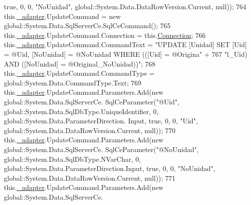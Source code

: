 \begin{DoxyCode}
       \textcolor{keyword}{true}, 0, 0, \textcolor{stringliteral}{"NoUnidad"}, global::System.Data.DataRowVersion.Current, null));
764             this.\hyperlink{class_proyecto___integrador__3_1_1ds_unidad_table_adapters_1_1_unidad_table_adapter_ab399a596bea65cb98131fe8b2f74a979}{\_adapter}.UpdateCommand = \textcolor{keyword}{new} global::System.Data.SqlServerCe.SqlCeCommand();
765             this.\hyperlink{class_proyecto___integrador__3_1_1ds_unidad_table_adapters_1_1_unidad_table_adapter_ab399a596bea65cb98131fe8b2f74a979}{\_adapter}.UpdateCommand.Connection = this.\hyperlink{class_proyecto___integrador__3_1_1ds_unidad_table_adapters_1_1_unidad_table_adapter_a13a9c13fd0ce4e17d7f35891158864db}{Connection};
766             this.\hyperlink{class_proyecto___integrador__3_1_1ds_unidad_table_adapters_1_1_unidad_table_adapter_ab399a596bea65cb98131fe8b2f74a979}{\_adapter}.UpdateCommand.CommandText = \textcolor{stringliteral}{"UPDATE [Unidad] SET [Uid] = @Uid, [NoUnidad]
       = @NoUnidad WHERE (([Uid] = @Origina"} +
767                 \textcolor{stringliteral}{"l\_Uid) AND ([NoUnidad] = @Original\_NoUnidad))"};
768             this.\hyperlink{class_proyecto___integrador__3_1_1ds_unidad_table_adapters_1_1_unidad_table_adapter_ab399a596bea65cb98131fe8b2f74a979}{\_adapter}.UpdateCommand.CommandType = global::System.Data.CommandType.Text;
769             this.\hyperlink{class_proyecto___integrador__3_1_1ds_unidad_table_adapters_1_1_unidad_table_adapter_ab399a596bea65cb98131fe8b2f74a979}{\_adapter}.UpdateCommand.Parameters.Add(\textcolor{keyword}{new} global::System.Data.SqlServerCe.
      SqlCeParameter(\textcolor{stringliteral}{"@Uid"}, global::System.Data.SqlDbType.UniqueIdentifier, 0, global::System.Data.ParameterDirection.
      Input, \textcolor{keyword}{true}, 0, 0, \textcolor{stringliteral}{"Uid"}, global::System.Data.DataRowVersion.Current, null));
770             this.\hyperlink{class_proyecto___integrador__3_1_1ds_unidad_table_adapters_1_1_unidad_table_adapter_ab399a596bea65cb98131fe8b2f74a979}{\_adapter}.UpdateCommand.Parameters.Add(\textcolor{keyword}{new} global::System.Data.SqlServerCe.
      SqlCeParameter(\textcolor{stringliteral}{"@NoUnidad"}, global::System.Data.SqlDbType.NVarChar, 0, global::System.Data.ParameterDirection.Input,
       \textcolor{keyword}{true}, 0, 0, \textcolor{stringliteral}{"NoUnidad"}, global::System.Data.DataRowVersion.Current, null));
771             this.\hyperlink{class_proyecto___integrador__3_1_1ds_unidad_table_adapters_1_1_unidad_table_adapter_ab399a596bea65cb98131fe8b2f74a979}{\_adapter}.UpdateCommand.Parameters.Add(\textcolor{keyword}{new} global::System.Data.SqlServerCe.

\end{DoxyCode}
